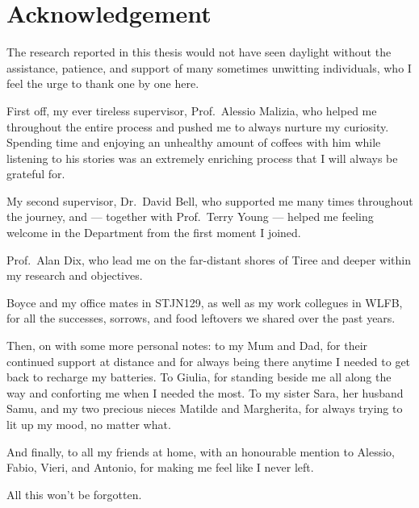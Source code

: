 %
\chapter*{Acknowledgement}\label{sec:acknowledgement}
\vspace*{-10mm}

The research reported in this thesis would not have seen daylight without the assistance, patience, and support of many sometimes unwitting individuals, who I feel the urge to thank one by one here.

First off, my ever tireless supervisor, Prof.~Alessio Malizia, who helped me throughout the entire process and pushed me to always nurture my curiosity. Spending time and enjoying an unhealthy amount of coffees with him while listening to his stories was an extremely enriching process that I will always be grateful for.

My second supervisor, Dr.~David Bell, who supported me many times throughout the journey, and --- together with Prof.~Terry Young --- helped me feeling welcome in the Department from the first moment I joined.

Prof.~Alan Dix, who lead me on the far-distant shores of Tiree and deeper within my research and objectives.

Boyce and my office mates in STJN129, as well as my work collegues in WLF\-B, for all the successes, sorrows, and food leftovers we shared over the past years.

Then, on with some more personal notes: to my Mum and Dad, for their continued support at distance and for always being there anytime I needed to get back to recharge my batteries. To Giulia, for standing beside me all along the way and conforting me when I needed the most. To my sister Sara, her husband Samu, and my two precious nieces Matilde and Margherita, for always trying to lit up my mood, no matter what.

And finally, to all my friends at home, with an honourable mention to Alessio, Fabio, Vieri, and Antonio, for making me feel like I never left.

All this won't be forgotten.
